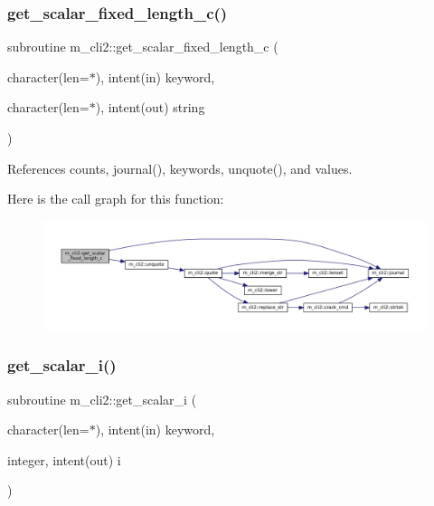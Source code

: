 \subsubsection{\texorpdfstring{get\+\_\+scalar\+\_\+fixed\+\_\+length\+\_\+c()}{get\_scalar\_fixed\_length\_c()}}
{\footnotesize\ttfamily subroutine m\+\_\+cli2\+::get\+\_\+scalar\+\_\+fixed\+\_\+length\+\_\+c (\begin{DoxyParamCaption}\item[{character(len=$\ast$), intent(in)}]{keyword,  }\item[{character(len=$\ast$), intent(out)}]{string }\end{DoxyParamCaption})\hspace{0.3cm}{\ttfamily [private]}}



References counts, journal(), keywords, unquote(), and values.

Here is the call graph for this function\+:\nopagebreak
\begin{figure}[H]
\begin{center}
\leavevmode
\includegraphics[width=350pt]{namespacem__cli2_a9dcc99d34db1771959a1461274ae073e_cgraph}
\end{center}
\end{figure}
\mbox{\label{namespacem__cli2_a9c5208ef6763da7e68dd1e118bea0b7a}} 
\subsubsection{\texorpdfstring{get\+\_\+scalar\+\_\+i()}{get\_scalar\_i()}}
{\footnotesize\ttfamily subroutine m\+\_\+cli2\+::get\+\_\+scalar\+\_\+i (\begin{DoxyParamCaption}\item[{character(len=$\ast$), intent(in)}]{keyword,  }\item[{integer, intent(out)}]{i }\end{DoxyParamCaption})\hspace{0.3cm}{\ttfamily [private]}}



